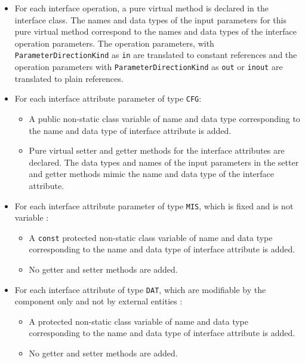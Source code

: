 \begin{itemize}
\item For each interface operation, a pure virtual method is declared in the interface class. The names and data types of the input parameters for this pure virtual method correspond to the names and data types of the interface operation parameters. The operation parameters, with \texttt{ParameterDirectionKind} as \texttt{in} are translated to constant references and the operation parameters with \texttt{ParameterDirectionKind} as \texttt{out} or \texttt{inout} are translated to plain references. 
\item For each interface attribute parameter of type \texttt{CFG}:
\begin{itemize}
\item A public non-static class variable of name and data type corresponding to the name and data type of interface attribute is added.
\item Pure virtual setter and getter methods for the interface attributes are declared. The data types and names of the input parameters in the setter and getter methods mimic the name and data type of the interface attribute.
\end{itemize} 
\item For each interface attribute parameter of type \texttt{MIS}, which is fixed and is not variable \cite{SpecMetamodel}: 
\begin{itemize}
\item A \texttt{const} protected non-static class variable of name and data type corresponding to the name and data type of interface attribute is added.
\item No getter and setter methods are added.
\end{itemize}
\item For each interface attribute of type \texttt{DAT}, which are modifiable by the component only and not by external entities \cite{SpecMetamodel}:
\begin{itemize}
\item A protected non-static class variable of name and data type corresponding to the name and data type of interface attribute is added.
\item No getter and setter methods are added.
\end{itemize}   
\end{itemize}

